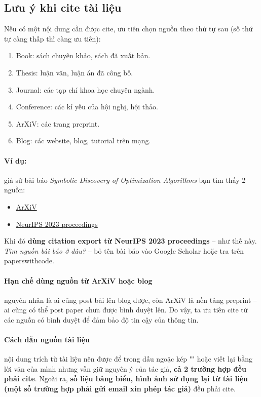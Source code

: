 \subsection{Lưu ý khi cite tài liệu}

Nếu có một nội dung cần được cite, ưu tiên chọn nguồn theo thứ tự sau (số thứ tự càng thấp thì càng ưu tiên):

\begin{enumerate}
\item Book: sách chuyên khảo, sách đã xuất bản.
\item Thesis: luận văn, luận án đã công bố.
\item Journal: các tạp chí khoa học chuyên ngành.
\item Conference: các kỉ yếu của hội nghị, hội thảo.
\item ArXiV: các trang preprint.
\item Blog: các website, blog, tutorial trên mạng.
\end{enumerate}

\paragraph{Ví dụ:} giả sử bài báo \textit{Symbolic Discovery of Optimization Algorithms} bạn tìm thấy 2 nguồn:
\begin{itemize}
\item \href{https://arxiv.org/abs/2302.06675}{ArXiV}
\item \href{https://proceedings.neurips.cc/paper\_files/paper/2023/hash/9a39b4925e35cf447ccba8757137d84f-Abstract-Conference.html}{NeurIPS 2023 proceedings}
\end{itemize}

Khi đó \textbf{dùng citation export từ NeurIPS 2023 proceedings} -- như thế này\cite{chen2024symbolic}. \textit{Tìm nguồn bài báo ở đâu?} -- bỏ tên bài báo vào Google Scholar hoặc tra trên paperswithcode.

\paragraph{Hạn chế dùng nguồn từ ArXiV hoặc blog} nguyên nhân là ai cũng post bài lên blog được, còn ArXiV là nền tảng preprint -- ai cũng có thể post paper chưa được bình duyệt lên. Do vậy, ta ưu tiên cite từ các nguồn có bình duyệt để đảm bảo độ tin cậy của thông tin.

\paragraph{Cách dẫn nguồn tài liệu} nội dung trích từ tài liệu nên được để trong dấu ngoặc kép "" hoặc viết lại bằng lời văn của mình nhưng vẫn giữ nguyên ý của tác giả, \textbf{cả 2 trường hợp đều phải cite}. Ngoài ra, \textbf{số liệu bảng biểu, hình ảnh sử dụng lại từ tài liệu (một số trường hợp phải gửi email xin phép tác giả)} đều phải cite.
